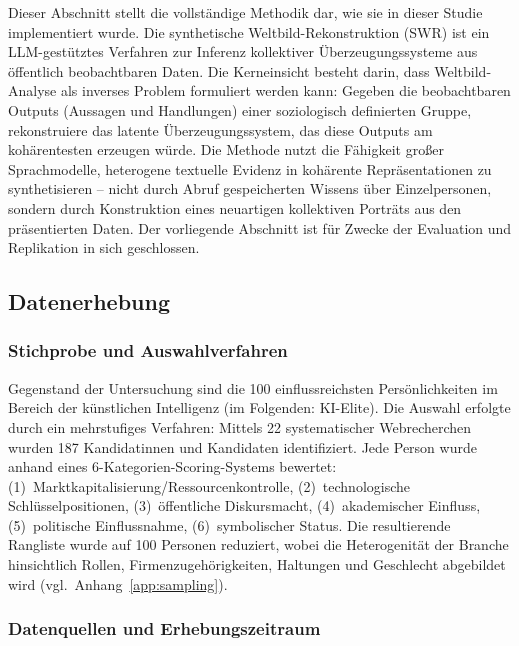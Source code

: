 \documentclass[12pt,a4paper]{article}
\begin{document}
Dieser Abschnitt stellt die vollst\"andige Methodik dar, wie sie in dieser Studie implementiert wurde. Die synthetische Weltbild-Rekonstruktion (SWR) ist ein LLM-gest\"utztes Verfahren zur Inferenz kollektiver \"Uberzeugungssysteme aus \"offentlich beobachtbaren Daten. Die Kerneinsicht besteht darin, dass Weltbild-Analyse als inverses Problem formuliert werden kann: Gegeben die beobachtbaren Outputs (Aussagen und Handlungen) einer soziologisch definierten Gruppe, rekonstruiere das latente \"Uberzeugungssystem, das diese Outputs am koh\"arentesten erzeugen w\"urde. Die Methode nutzt die F\"ahigkeit gro\ss{}er Sprachmodelle, heterogene textuelle Evidenz in koh\"arente Repr\"asentationen zu synthetisieren -- nicht durch Abruf gespeicherten Wissens \"uber Einzelpersonen, sondern durch Konstruktion eines neuartigen kollektiven Portr\"ats aus den pr\"asentierten Daten. Der vorliegende Abschnitt ist f\"ur Zwecke der Evaluation und Replikation in sich geschlossen.


\subsection{Datenerhebung}
\label{sec:methodik:daten}

\subsubsection{Stichprobe und Auswahlverfahren}

Gegenstand der Untersuchung sind die 100 einflussreichsten Pers\"onlichkeiten im Bereich der k\"unstlichen Intelligenz (im Folgenden: KI-Elite). Die Auswahl erfolgte durch ein mehrstufiges Verfahren: Mittels 22 systematischer Webrecherchen wurden 187 Kandidatinnen und Kandidaten identifiziert. Jede Person wurde anhand eines 6-Kategorien-Scoring-Systems bewertet: (1)~Marktkapitalisierung/Ressourcenkontrolle, (2)~technologische Schl\"usselpositionen, (3)~\"offentliche Diskursmacht, (4)~akademischer Einfluss, (5)~politische Einflussnahme, (6)~symbolischer Status. Die resultierende Rangliste wurde auf 100 Personen reduziert, wobei die Heterogenit\"at der Branche hinsichtlich Rollen, Firmenzugeh\"origkeiten, Haltungen und Geschlecht abgebildet wird (vgl.\ Anhang~\ref{app:sampling}).

\subsubsection{Datenquellen und Erhebungszeitraum}
\end{document}
